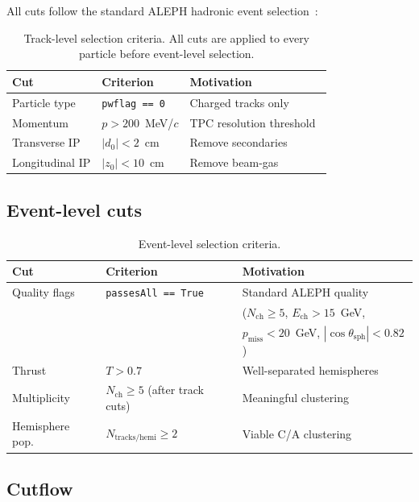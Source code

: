 \documentclass[11pt,a4paper]{article}
\begin{document}
All cuts follow the standard ALEPH hadronic event
selection~\cite{ALEPH:1998vtv,ALEPH:1998hhr,ALEPH:1999rgl}:

\begin{table}[htbp]
\centering
\caption{Track-level selection criteria.  All cuts are applied to
  every particle before event-level selection.}
\label{tbl:track-cuts}
\begin{tabular}{lll}
\toprule
Cut & Criterion & Motivation \\
\midrule
Particle type & \texttt{pwflag == 0} & Charged tracks only \\
Momentum & $p > 200$~MeV/$c$ & TPC resolution threshold~\cite{ALEPH:1998hhr} \\
Transverse IP & $|d_0| < 2$~cm & Remove secondaries~\cite{ALEPH:1998vtv} \\
Longitudinal IP & $|z_0| < 10$~cm & Remove beam-gas~\cite{ALEPH:1998vtv} \\
\bottomrule
\end{tabular}
\end{table}

\subsection{Event-level cuts}
\label{sec:event-cuts}

\begin{table}[htbp]
\centering
\caption{Event-level selection criteria.}
\label{tbl:event-cuts}
\begin{tabular}{lll}
\toprule
Cut & Criterion & Motivation \\
\midrule
Quality flags & \texttt{passesAll == True} &
  Standard ALEPH quality \\
 & & ($N_\text{ch} \ge 5$, $E_\text{ch} > 15$~GeV, \\
 & & $p_\text{miss} < 20$~GeV, $|\cos\theta_\text{sph}| < 0.82$) \\
Thrust & $T > 0.7$ & Well-separated hemispheres \\
Multiplicity & $N_\text{ch} \ge 5$ (after track cuts) & Meaningful clustering \\
Hemisphere pop. & $N_\text{tracks/hemi} \ge 2$ & Viable C/A clustering \\
\bottomrule
\end{tabular}
\end{table}

\subsection{Cutflow}
\label{sec:cutflow}
\end{document}
